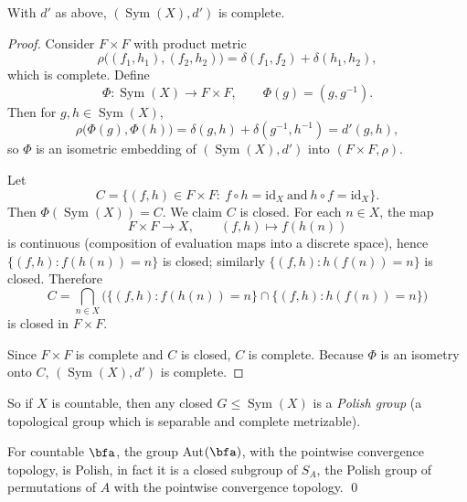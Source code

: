\begin{lemma}
    With $d'$ as above, $(\operatorname{Sym}(X),d')$ is complete.
\end{lemma}

\begin{proof}

    Consider $F\times F$ with product metric
    \[
        \rho\bigl((f_1,h_1),(f_2,h_2)\bigr)=\delta(f_1,f_2)+\delta(h_1,h_2),
    \]
    which is complete. Define
    \[
        \Phi:\operatorname{Sym}(X)\longrightarrow F\times F,\qquad
        \Phi(g)=(g,g^{-1}).
    \]
    Then for $g,h\in\operatorname{Sym}(X)$,
    \[
        \rho\bigl(\Phi(g),\Phi(h)\bigr)=\delta(g,h)+\delta(g^{-1},h^{-1})=d'(g,h),
    \]
    so $\Phi$ is an isometric embedding of $(\operatorname{Sym}(X),d')$ into $(F\times F,\rho)$.

    Let
    \[
        C=\{(f,h)\in F\times F:\ f\circ h=\mathrm{id}_X \ \text{and}\ h\circ f=\mathrm{id}_X\}.
    \]
    Then $\Phi(\operatorname{Sym}(X))=C$. We claim $C$ is closed. For each $n\in X$, the map
    \[
        F\times F \to X,\qquad (f,h)\mapsto f(h(n))
    \]
    is continuous (composition of evaluation maps into a discrete space), hence
    $\{(f,h): f(h(n))=n\}$ is closed; similarly $\{(f,h): h(f(n))=n\}$ is closed. Therefore
    \[
        C=\bigcap_{n\in X}\Big(\{(f,h): f(h(n))=n\}\cap \{(f,h): h(f(n))=n\}\Big)
    \]
    is closed in $F\times F$.

    Since $F\times F$ is complete and $C$ is closed, $C$ is complete. Because $\Phi$ is an
    isometry onto $C$, $(\operatorname{Sym}(X),d')$ is complete.
\end{proof}


So if $X$ is countable, then any closed $G \leq \operatorname{Sym}(X)$ is a \emph{Polish group} (a topological group which is separable and complete metrizable).


\begin{theorem}
    For countable $\bfa$, the group Aut$(\bfa )$, with the pointwise convergence topology, is Polish, in fact it is a closed subgroup of $S_A$, the Polish group of permutations of $A$ with the pointwise convergence topology.
    \qed
\end{theorem}
